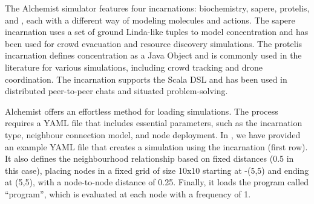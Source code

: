 The Alchemist simulator features four incarnations: 
  biochemistry, sapere, protelis, and \scafi{}, 
  each with a different way of modeling molecules and actions. 
The sapere incarnation uses a set of ground Linda-like tuples 
 to model concentration and has been used for crowd evacuation and resource discovery simulations. 
The protelis incarnation defines concentration as a Java Object and is commonly used in the literature for various simulations, 
 including crowd tracking and drone coordination. 
The \scafi{} incarnation supports the \scafi{} Scala DSL 
 and has been used in distributed peer-to-peer chats and situated problem-solving.

Alchemist offers an effortless method for loading simulations. 
 The process requires a YAML file that includes essential parameters, 
 such as the incarnation type, neighbour connection model, and node deployment. 
 In , we have provided an example YAML file 
 that creates a simulation using the \scafi{} incarnation (first row). 
 It also defines the neighbourhood relationship based on fixed distances (0.5 in this case), 
 placing nodes in a fixed grid of size 10x10 starting at -(5,5) and ending at (5,5), 
 with a node-to-node distance of 0.25. 
 Finally, it loads the \scafi{} program called ``program'', 
 which is evaluated at each node with a frequency of 1. 
